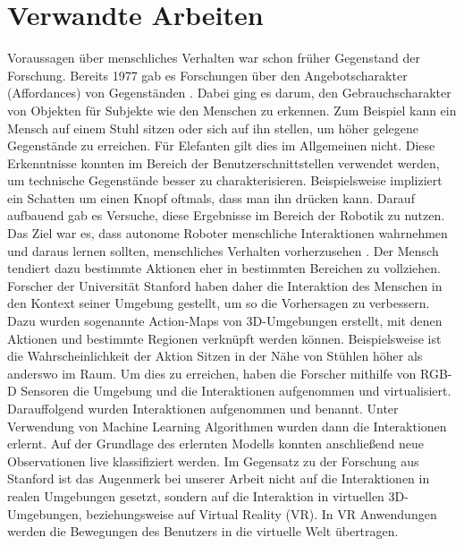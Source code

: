 
\section{Verwandte Arbeiten}
Voraussagen über menschliches Verhalten war schon früher Gegenstand der Forschung. Bereits 1977 gab es Forschungen über den Angebotscharakter (Affordances) von Gegenständen \cite{gibson}. Dabei ging es darum, den Gebrauchscharakter von Objekten für Subjekte wie den Menschen zu erkennen. Zum Beispiel kann ein Mensch auf einem Stuhl sitzen oder sich auf ihn stellen, um höher gelegene Gegenstände zu erreichen. Für Elefanten gilt dies im Allgemeinen nicht. Diese Erkenntnisse konnten im Bereich der Benutzerschnittstellen verwendet werden, um technische Gegenstände besser zu charakterisieren. Beispielsweise impliziert ein Schatten um einen Knopf oftmals, dass man ihn drücken kann.
\newline
Darauf aufbauend gab es Versuche, diese Ergebnisse im Bereich der Robotik zu nutzen. Das Ziel war es, dass autonome Roboter menschliche Interaktionen wahrnehmen und daraus lernen sollten, menschliches Verhalten vorherzusehen \cite{fritz, montesano,stark, sun}.
\newline
Der Mensch tendiert dazu bestimmte Aktionen eher in bestimmten Bereichen zu vollziehen. Forscher der Universität Stanford haben daher
die Interaktion des Menschen in den Kontext seiner Umgebung gestellt, um so die Vorhersagen zu verbessern. Dazu wurden sogenannte
Action-Maps von 3D-Umgebungen erstellt, mit denen Aktionen und bestimmte Regionen verknüpft werden können. Beispielsweise ist
die Wahrscheinlichkeit der Aktion \glqq{}Sitzen\grqq{} in der Nähe von Stühlen höher als anderswo im Raum. Um dies zu erreichen, haben die Forscher mithilfe von RGB-D Sensoren die Umgebung und die Interaktionen aufgenommen und virtualisiert. Darauffolgend wurden Interaktionen aufgenommen und benannt. Unter Verwendung von Machine Learning Algorithmen wurden dann die Interaktionen erlernt. Auf der Grundlage des erlernten Modells konnten anschließend neue Observationen live klassifiziert werden.
\newline
Im Gegensatz zu der Forschung aus Stanford ist das Augenmerk bei unserer Arbeit nicht auf die Interaktionen in realen Umgebungen gesetzt, sondern auf die Interaktion in virtuellen 3D-Umgebungen, beziehungsweise auf Virtual Reality (VR). In VR Anwendungen werden die Bewegungen des Benutzers in die virtuelle Welt übertragen.



